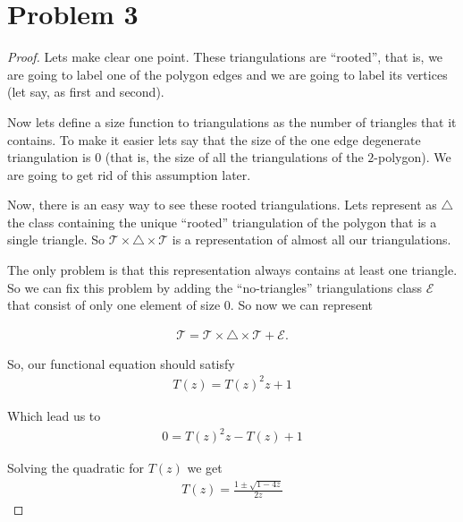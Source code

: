 ﻿\section{Problem 3}

\begin{proof}
    Lets make clear one point. These triangulations are ``rooted'', that is, we are going to label one of the polygon edges and
    we are going to label its vertices (let say, as first and second).\pn

    Now lets define a size function to triangulations as the number of triangles that it contains.
    To make it easier lets say that the size of the one edge degenerate triangulation is $0$ (that is, the size of all the triangulations
    of the $2$-polygon). We are going to get rid of this assumption later.\pn
    
    Now, there is an easy way to see these rooted triangulations. Lets represent as $\triangle$ the class containing the unique ``rooted'' 
    triangulation of the polygon that is a single triangle. So $\mathcal{T} \times \triangle \times \mathcal{T}$ is a representation of almost 
		all our triangulations.\pn
		
    The only problem is that this representation always contains at least one triangle. So we can fix this problem by adding the ``no-triangles''
    triangulations class $\mathcal{E}$ that consist of only one element of size $0$. So now we can represent 
    
    \begin{align}
        \mathcal{T} = \mathcal{T} \times \triangle \times \mathcal{T} + \mathcal{E}.
    \end{align}\pn
    
    So, our functional equation should satisfy
    \begin{align}
        T(z) = T(z)^2 z + 1
    \end{align}\pn
    
    Which lead us to
    \begin{align}
        0 = T(z)^2 z - T(z) + 1
    \end{align}\pn
    
    Solving the quadratic for $T(z)$ we get
    \begin{align}
        T(z) = \frac{1 \pm \sqrt{1 - 4z}}{2z}
    \end{align}\pn
    

\end{proof}
